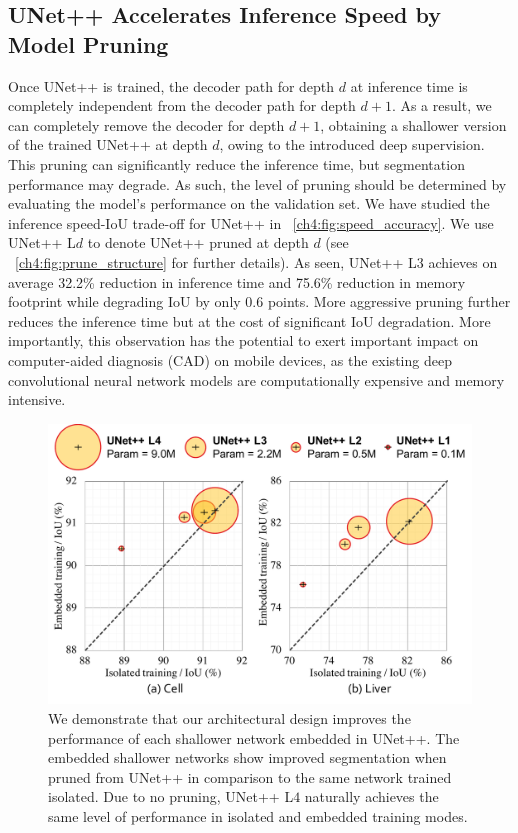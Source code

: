 \subsection{UNet++ Accelerates Inference Speed by Model Pruning}
\label{ch4:model_pruning}

Once UNet++ is trained, the decoder path for depth $d$ at inference time is completely independent from the decoder path for depth $d+1$. As a result, we can completely remove the decoder for depth $d+1$, obtaining a shallower version of the trained UNet++ at depth $d$, owing to the introduced deep supervision. This pruning can significantly reduce the inference time, but segmentation performance may degrade. As such, the level of pruning should be determined by evaluating the model's performance on the validation set. We have studied the inference speed-IoU trade-off for UNet++ in \figurename~\ref{ch4:fig:speed_accuracy}. We use UNet++ L$d$ to denote UNet++ pruned at depth $d$ (see \figurename~\ref{ch4:fig:prune_structure} for further details). As seen, UNet++ L${3}$ achieves on average 32.2\% reduction in inference time and 75.6\% reduction in memory footprint while degrading IoU by only 0.6 points. More aggressive pruning further reduces the inference time but at the cost of significant IoU degradation. More importantly, this observation has the potential to exert important impact on computer-aided diagnosis (CAD) on mobile devices, as the existing deep convolutional neural network models are computationally expensive and memory intensive.

\begin{figure}[t]
\begin{center}
\includegraphics[width=0.8\linewidth]{Figures/CH4/fig_isolated_embedded.pdf}
\end{center}
\caption[Embedded UNet++ Surpasses Isolated U-Nets]{
We demonstrate that our architectural design improves the performance of each shallower network embedded in UNet++. The embedded shallower networks show improved segmentation when pruned from UNet++ in comparison to the same network trained isolated. Due to no pruning, UNet++ L$4$ naturally achieves the same level of performance in isolated and embedded training modes.}
\label{ch4:fig:pruned_vs_stand-alone}
\end{figure}



